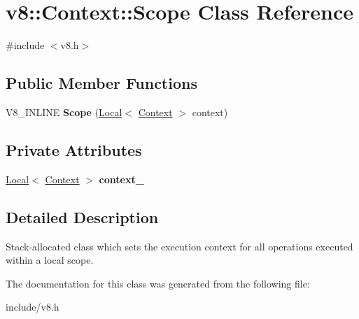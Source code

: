 \hypertarget{classv8_1_1_context_1_1_scope}{}\section{v8\+:\+:Context\+:\+:Scope Class Reference}
\label{classv8_1_1_context_1_1_scope}


{\ttfamily \#include $<$v8.\+h$>$}

\subsection*{Public Member Functions}
\begin{DoxyCompactItemize}
\item 
V8\+\_\+\+I\+N\+L\+I\+NE {\bfseries Scope} (\hyperlink{classv8_1_1_local}{Local}$<$ \hyperlink{classv8_1_1_context}{Context} $>$ context)\hypertarget{classv8_1_1_context_1_1_scope_a3c7ec79eb92ab9bb2784e4ff0c5557c1}{}\label{classv8_1_1_context_1_1_scope_a3c7ec79eb92ab9bb2784e4ff0c5557c1}

\end{DoxyCompactItemize}
\subsection*{Private Attributes}
\begin{DoxyCompactItemize}
\item 
\hyperlink{classv8_1_1_local}{Local}$<$ \hyperlink{classv8_1_1_context}{Context} $>$ {\bfseries context\+\_\+}\hypertarget{classv8_1_1_context_1_1_scope_a59884a1f9bba50754d1c1dd2ec0fec99}{}\label{classv8_1_1_context_1_1_scope_a59884a1f9bba50754d1c1dd2ec0fec99}

\end{DoxyCompactItemize}


\subsection{Detailed Description}
Stack-\/allocated class which sets the execution context for all operations executed within a local scope. 

The documentation for this class was generated from the following file\+:\begin{DoxyCompactItemize}
\item 
include/v8.\+h\end{DoxyCompactItemize}
